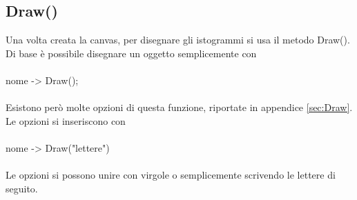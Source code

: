 \documentclass[10pt,a4paper]{article}
\begin{document}
\subsection{Draw()}
Una volta creata la canvas, per disegnare gli istogrammi si usa il metodo Draw(). Di base è possibile disegnare un oggetto semplicemente con\\\\
nome -> Draw();\\\\ 
Esistono però molte opzioni di questa funzione, riportate in appendice \ref{sec:Draw}. Le opzioni si inseriscono con\\\\
nome -> Draw("lettere")\\\\
Le opzioni si possono unire con virgole o semplicemente scrivendo le lettere di seguito.
\end{document}

